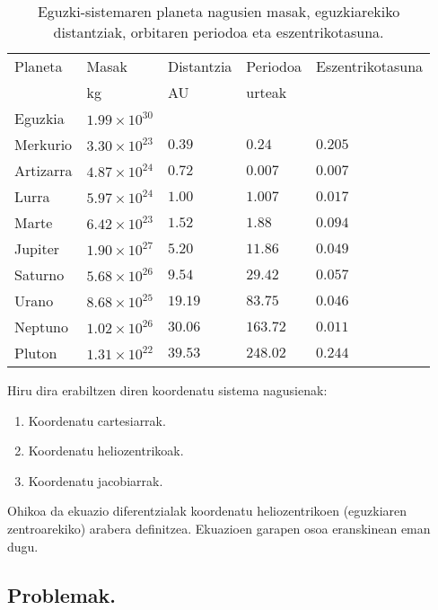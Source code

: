 \begin{table} [h!]
\caption{Eguzki-sistemaren planeta nagusien masak, eguzkiarekiko distantziak, orbitaren periodoa eta eszentrikotasuna.}
\label{tab:eguz-sist}       %
\begin{tabular}{l l l l l} 
\hline
 Planeta   &  Masak                 & Distantzia   & Periodoa    & Eszentrikotasuna\\   
           &  kg                    & AU           &   urteak    &               \\ \hline
 Eguzkia   &  $1.99 \times 10^{30}$ &              &             &               \\         
 Merkurio  &  $3.30 \times 10^{23}$ & $0.39$       &  $0.24$     &  $0.205$      \\
 Artizarra &  $4.87 \times 10^{24}$ & $0.72$       &  $0.007$    &  $0.007$      \\
 Lurra     &  $5.97 \times 10^{24}$ & $1.00$       &  $1.007$    &  $0.017$      \\
 Marte     &  $6.42 \times 10^{23}$ & $1.52$       &  $1.88$     &  $0.094$      \\ \hline
 Jupiter   &  $1.90 \times 10^{27}$ & $5.20$       &  $11.86$    &  $0.049$      \\
 Saturno   &  $5.68 \times 10^{26}$ & $9.54$       &  $29.42$    &  $0.057$      \\
 Urano     &  $8.68 \times 10^{25}$ & $19.19$      &  $83.75$    &  $0.046$      \\
 Neptuno   &  $1.02 \times 10^{26}$ & $30.06$      &  $163.72$   &  $0.011$      \\
 Pluton    &  $1.31 \times 10^{22}$ & $39.53$      &  $248.02$   &  $0.244$      \\
\hline
\end{tabular}
\end{table}

Hiru dira erabiltzen diren koordenatu sistema nagusienak:
\begin{enumerate}
\item Koordenatu cartesiarrak.
\item Koordenatu heliozentrikoak.
\item Koordenatu jacobiarrak.
\end{enumerate}

Ohikoa da ekuazio diferentzialak koordenatu heliozentrikoen (eguzkiaren zentroarekiko) arabera definitzea. 
Ekuazioen garapen osoa eranskinean eman dugu.

\subsection{Problemak.}
\label{ss:342}

